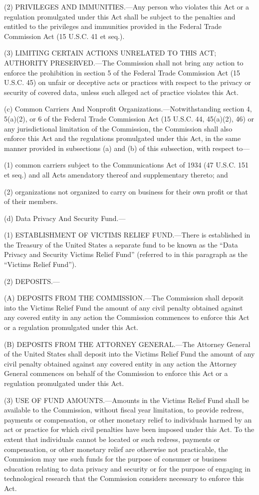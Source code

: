 (2) PRIVILEGES AND IMMUNITIES.—Any person who violates this Act or a regulation promulgated under this Act shall be subject to the penalties and entitled to the privileges and immunities provided in the Federal Trade Commission Act (15 U.S.C. 41 et seq.).

(3) LIMITING CERTAIN ACTIONS UNRELATED TO THIS ACT; AUTHORITY PRESERVED.—The Commission shall not bring any action to enforce the prohibition in section 5 of the Federal Trade Commission Act (15 U.S.C. 45) on unfair or deceptive acts or practices with respect to the privacy or security of covered data, unless such alleged act of practice violates this Act.

(c) Common Carriers And Nonprofit Organizations.—Notwithstanding section 4, 5(a)(2), or 6 of the Federal Trade Commission Act (15 U.S.C. 44, 45(a)(2), 46) or any jurisdictional limitation of the Commission, the Commission shall also enforce this Act and the regulations promulgated under this Act, in the same manner provided in subsections (a) and (b) of this subsection, with respect to—

(1) common carriers subject to the Communications Act of 1934 (47 U.S.C. 151 et seq.) and all Acts amendatory thereof and supplementary thereto; and

(2) organizations not organized to carry on business for their own profit or that of their members.

(d) Data Privacy And Security Fund.—

(1) ESTABLISHMENT OF VICTIMS RELIEF FUND.—There is established in the Treasury of the United States a separate fund to be known as the “Data Privacy and Security Victims Relief Fund” (referred to in this paragraph as the “Victims Relief Fund”).

(2) DEPOSITS.—

(A) DEPOSITS FROM THE COMMISSION.—The Commission shall deposit into the Victims Relief Fund the amount of any civil penalty obtained against any covered entity in any action the Commission commences to enforce this Act or a regulation promulgated under this Act.

(B) DEPOSITS FROM THE ATTORNEY GENERAL.—The Attorney General of the United States shall deposit into the Victims Relief Fund the amount of any civil penalty obtained against any covered entity in any action the Attorney General commences on behalf of the Commission to enforce this Act or a regulation promulgated under this Act.

(3) USE OF FUND AMOUNTS.—Amounts in the Victims Relief Fund shall be available to the Commission, without fiscal year limitation, to provide redress, payments or compensation, or other monetary relief to individuals harmed by an act or practice for which civil penalties have been imposed under this Act. To the extent that individuals cannot be located or such redress, payments or compensation, or other monetary relief are otherwise not practicable, the Commission may use such funds for the purpose of consumer or business education relating to data privacy and security or for the purpose of engaging in technological research that the Commission considers necessary to enforce this Act.

